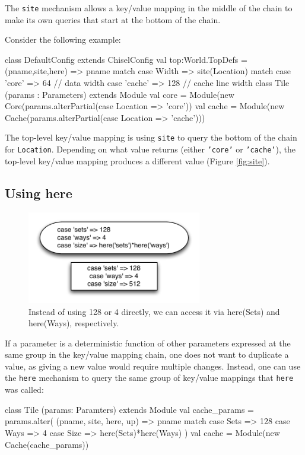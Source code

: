 \documentclass[10pt,twocolumn]{article}
\def\code#1{{\small\tt #1}}
\begin{document}
The \code{site} mechanism allows a key/value mapping in the middle of the chain to make its own queries that start at the bottom of the chain.

Consider the following example:
\begin{scala}
class DefaultConfig extends ChiselConfig { 
  val top:World.TopDefs = {
    (pname,site,here) => pname match {
       case Width => site(Location) match {
         case 'core' => 64 // data width
         case 'cache' => 128  // cache line width
       }
    }
  }
}
class Tile (params : Parameters) extends Module { 
  val core = Module(new Core(params.alterPartial({case Location => 'core'}))
  val cache = Module(new Cache(params.alterPartial({case Location => 'cache'})))
}
\end{scala}
The top-level key/value mapping is using \code{site} to query the bottom of the chain for \code{Location}. Depending on what value returns (either \code{'core'} or \code{'cache'}), the top-level key/value mapping produces a different value (Figure \ref{fig:site}).

\subsection{Using here}
\label{sec::here}

\begin{figure}[h]
\centering
\includegraphics[width=3in]{figs/here.pdf}
\caption{Instead of using 128 or 4 directly, we can access it via here(Sets) and here(Ways), respectively.}
\label{fig:alter2}
\end{figure}

If a parameter is a deterministic function of other parameters expressed at the same group in the key/value mapping chain, one does not want to duplicate a value, as giving a new value would require multiple changes. Instead, one can use the \code{here} mechanism to query the same group of key/value mappings that \code{here} was called:

\begin{scala}
class Tile (params: Paramters) extends Module { 
  val cache_params = params.alter(
    (pname, site, here, up) => pname match {
      case Sets => 128
      case Ways => 4
      case Size => here(Sets)*here(Ways)
    })
  val cache = Module(new Cache(cache_params))
}
\end{scala}
\end{document}
